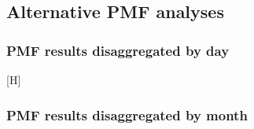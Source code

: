 \documentclass[
  letterpaper,
  DIV=11,
  numbers=noendperiod]{scrartcl}
\makeatletter
\renewenvironment{figure}%
   {\renewcommand\familydefault\sfdefault
    \@float{figure}}
   {\end@float}
\makeatother
\begin{document}
\newpage

\subsection{Alternative PMF analyses}\label{alternative-pmf-analyses}

\subsubsection{PMF results disaggregated by
day}\label{pmf-results-disaggregated-by-day}

\begin{figure}[H]

\caption{\label{fig-pmf-sup-day}Mass concentrations (ug/m3) of
contributions to PM2.5 mass by each of the four named sources identified
in the source analysis. From left to right, the source contributions
represented are `sulfur secondary', `mixed combustion', `dust', and
`transported dust'. Source contribution mass concentrations are shown by
day and color-coded by district, with purple for Fangshan, blue for
Huairou, green for Mentougou, and yellow for Miyun.}


\end{figure}%

\subsubsection{PMF results disaggregated by
month}\label{pmf-results-disaggregated-by-month}
\end{document}
